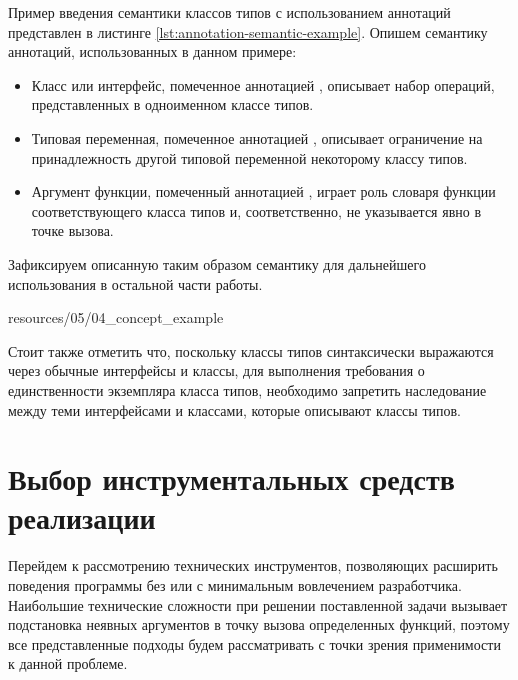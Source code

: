 Пример введения семантики классов типов с использованием аннотаций представлен в листинге \ref{lst:annotation-semantic-example}. Опишем семантику аннотаций, использованных в данном примере:
\begin{itemize}
    \item Класс или интерфейс, помеченное аннотацией , описывает набор операций, представленных в одноименном классе типов.
    \item Типовая переменная, помеченное аннотацией , описывает ограничение на принадлежность другой типовой переменной некоторому классу типов.
    \item Аргумент функции, помеченный аннотацией , играет роль словаря функции соответствующего класса типов и, соответственно, не указывается явно в точке вызова. 
\end{itemize}
Зафиксируем описанную таким образом семантику для дальнейшего использования в остальной части работы. 


{resources/05/04_concept_example}

Стоит также отметить что, поскольку классы типов синтаксически выражаются через обычные интерфейсы и классы, для выполнения требования о единственности экземпляра класса типов, необходимо запретить наследование между теми интерфейсами и классами, которые описывают классы типов. 

\section{Выбор инструментальных средств реализации}

Перейдем к рассмотрению технических инструментов, позволяющих расширить поведения программы без или с минимальным вовлечением разработчика. Наибольшие технические сложности при решении поставленной задачи вызывает подстановка неявных аргументов в точку вызова определенных функций, поэтому все представленные подходы будем рассматривать с точки зрения применимости к данной проблеме.

